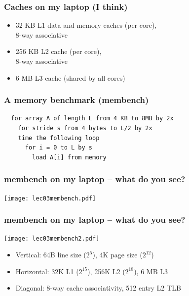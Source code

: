 \documentclass{beamer}
\begin{document}
\begin{frame}
  \frametitle{Caches on my laptop (I think)}

  \begin{itemize}
  \item 32 KB L1 data and memory caches (per core), \\
    8-way associative
  \item 256 KB L2 cache (per core), \\
    8-way associative
  \item 6 MB L3 cache (shared by all cores)
  \end{itemize}
\end{frame}


\begin{frame}[fragile]
  \frametitle{A memory benchmark (membench)}

\begin{verbatim}
  for array A of length L from 4 KB to 8MB by 2x
    for stride s from 4 bytes to L/2 by 2x
    time the following loop
      for i = 0 to L by s
        load A[i] from memory
\end{verbatim}

\end{frame}

\begin{frame}
  \frametitle{membench on my laptop -- what do you see?}

  \begin{center}
    \texttt{[image: lec03membench.pdf]}
  \end{center}
\end{frame}

\begin{frame}
  \frametitle{membench on my laptop -- what do you see?}

  \begin{center}
    \texttt{[image: lec03membench2.pdf]}
  \end{center}
  \begin{itemize}
    \item Vertical: 64B line size ($2^5$), 4K page size ($2^{12}$)
    \item Horizontal: 32K L1 ($2^{15}$), 256K L2 ($2^{18}$), 6 MB L3
    \item Diagonal: 8-way cache associativity, 512 entry L2 TLB
  \end{itemize}
\end{frame}
\end{document}
